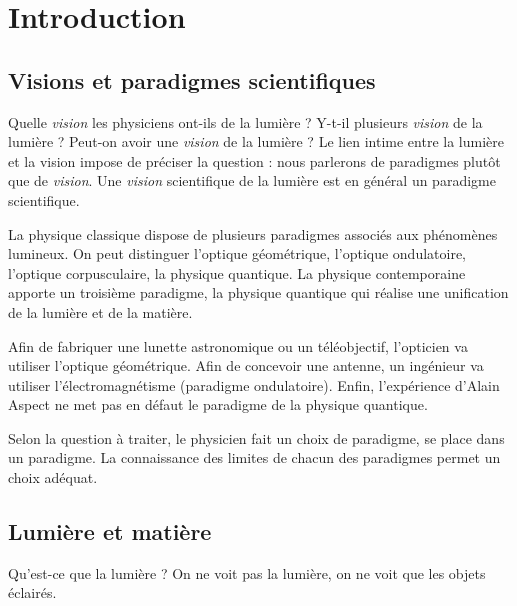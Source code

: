 \chapter{Introduction}

\section{Visions et paradigmes scientifiques}

Quelle {\it vision} les physiciens ont-ils de la lumière ? Y-t-il plusieurs {\it vision} de la lumière ? Peut-on avoir une {\it vision} de la lumière ? Le lien intime entre la lumière et la vision impose de préciser la question : nous parlerons de paradigmes plutôt que de {\it vision}. Une {\it vision} scientifique de la lumière est en général un paradigme scientifique.

La physique classique dispose de plusieurs paradigmes associés aux phénomènes lumineux. On peut distinguer l'optique géométrique, l'optique ondulatoire, l'optique corpusculaire, la physique quantique.
La physique contemporaine apporte un troisième paradigme, la physique quantique qui réalise une unification de la lumière et de la matière.

Afin de fabriquer une lunette astronomique ou un téléobjectif, l'opticien va utiliser l'optique géométrique. Afin de concevoir une antenne, un ingénieur va utiliser l'électromagnétisme (paradigme ondulatoire). Enfin, l'expérience d'Alain Aspect ne met pas en défaut le paradigme de la physique quantique.

Selon la question à traiter, le physicien fait un choix de paradigme, se place dans un paradigme. La connaissance des limites de chacun des paradigmes permet un choix adéquat.

\section{Lumière et matière}

Qu'est-ce que la lumière ? On ne voit pas la lumière, on ne voit que les objets éclairés.

